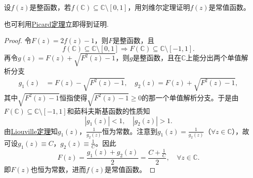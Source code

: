\documentclass[../../main.tex]{subfiles}%
\begin{document}
\begin{example}
设$f(z)$是整函数，若$f(\mathbb{C}) \subseteq \mathbb{C} \setminus [0,1]$，用刘维尔定理证明$f(z)$是常值函数。
\end{example}
\begin{note}
也可利用\hyperref[theorem:Picard定理-定理5.2.6]{Picard定理}立即得到证明.
\end{note}
\begin{proof}

令$F(z) = 2f(z) - 1$，则$F$是整函数，且
\[
f(\mathbb{C}) \subseteq \mathbb{C} \setminus [0,1] \Longrightarrow F(\mathbb{C}) \subseteq \mathbb{C} \setminus [-1,1].
\]
再令$g(z) = F(z) + \sqrt{F^2(z) - 1}$，则$g$是整函数，且在$\mathbb{C}$上能分出两个单值解析分支
\begin{align*}
g_1(z) &= F(z) - \sqrt{F^2(z) - 1}, \quad
g_2(z) = F(z) + \sqrt{F^2(z) - 1},
\end{align*}
其中$\sqrt{F^2(z) - 1}$恒指使得$\sqrt{F^2(z) - 1} \geqslant 0$的那一个单值解析分支。于是由$F(\mathbb{C}) \subseteq \mathbb{C} \setminus [-1,1]$和茹科夫斯基函数的性质知
\[
|g_1(z)| < 1, \quad |g_2(z)| > 1.
\]
由\hyperref[theorem:Liouville(刘维尔)定理]{Liouville定理}知$g_1(z)$，$\frac{1}{g_2(z)}$恒为常数。注意到$g_1(z) = \frac{1}{g_2(z)}$（$\forall z \in \mathbb{C}$），故可设$g_1(z) \equiv C$，$g_2(z) \equiv \frac{1}{C}$。因此
\[
F(z) = \frac{g_1(z) + g_2(z)}{2} = \frac{C + \frac{1}{C}}{2}, \quad \forall z \in \mathbb{C}.
\]
即$F(z)$也恒为常数，进而$f(z)$是常值函数。

\end{proof}
\end{document}
